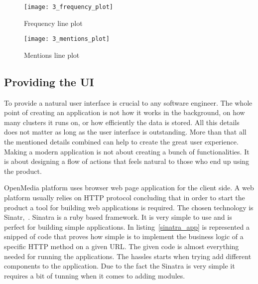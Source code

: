 \begin{figure}[!ht]
\centering
\texttt{[image: 3\_frequency\_plot]}
\caption{Frequency line plot}\label{frequency_plot}
\end{figure}

\begin{figure}[!ht]
\centering
\texttt{[image: 3\_mentions\_plot]}
\caption{Mentions line plot}\label{mentions_plot}
\end{figure}

\clearpage
\subsection{Providing the UI}
To provide a natural user interface is crucial to any software engineer. The whole point of creating an application is not how it works in the background, on how many clusters it runs on, or how efficiently the data is stored. All this details does not matter as long as the user interface is outstanding. More than that all the mentioned details combined can help to create the great user experience. Making a modern application is not about creating a bunch of functionalities. It is about designing a flow of actions that feels natural to those who end up using the product.

OpenMedia platform uses browser web page application for the client side. A web platform usually relies on HTTP protocol concluding that in order to start the product a tool for building web applications is required. The chosen technology is \mbox{Sinatr, \cite{sinatra}}. Sinatra is a ruby based framework. It is very simple to use and is perfect for building simple applications. In \mbox{listing \ref{sinatra_app}} is represented a snipped of code that proves how simple is to implement the business logic of a specific HTTP method on a given URL. The given code is almost everything needed for running the applications. The hassles starts when trying add different components to the application. Due to the fact the Sinatra is very simple it requires a bit of tunning when it comes to adding modules.



